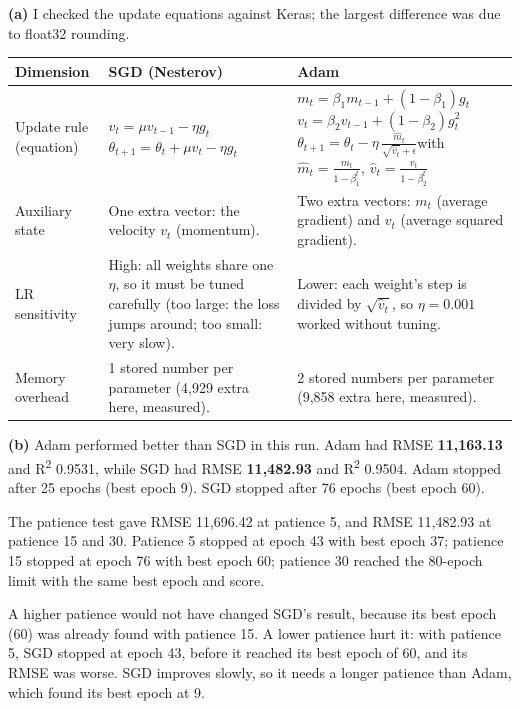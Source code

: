\documentclass[12pt,a4paper]{article}
\begin{document}
\begin{answerbox}
\textbf{(a)} I checked the update equations against Keras; the largest difference was due to float32 rounding.

\begin{center}
\renewcommand{\arraystretch}{1.5}
\begin{tabular}{|p{3.5cm}|p{4.5cm}|p{4.5cm}|}
\hline
\textbf{Dimension} & \textbf{SGD (Nesterov)} & \textbf{Adam} \\
\hline
Update rule (equation) & \small $v_t=\mu v_{t-1}-\eta g_t$\newline $\theta_{t+1}=\theta_t+\mu v_t-\eta g_t$ & \small $m_t=\beta_1 m_{t-1}+(1-\beta_1)g_t$\newline $v_t=\beta_2 v_{t-1}+(1-\beta_2)g_t^2$\newline $\theta_{t+1}=\theta_t-\eta\,\frac{\hat m_t}{\sqrt{\hat v_t}+\epsilon}$\newline with $\hat m_t=\frac{m_t}{1-\beta_1^t}$, $\hat v_t=\frac{v_t}{1-\beta_2^t}$ \\[4pt]
\hline
Auxiliary state & \small One extra vector: the velocity $v_t$ (momentum). & \small Two extra vectors: $m_t$ (average gradient) and $v_t$ (average squared gradient). \\[4pt]
\hline
LR sensitivity & \small High: all weights share one $\eta$, so it must be tuned carefully (too large: the loss jumps around; too small: very slow). & \small Lower: each weight's step is divided by $\sqrt{\hat v_t}$, so $\eta=0.001$ worked without tuning. \\[4pt]
\hline
Memory overhead & \small 1 stored number per parameter (4,929 extra here, measured). & \small 2 stored numbers per parameter (9,858 extra here, measured). \\[4pt]
\hline
\end{tabular}
\end{center}

\textbf{(b)} Adam performed better than SGD in this run. Adam had RMSE \textbf{11,163.13} and R\textsuperscript{2} 0.9531, while SGD had RMSE \textbf{11,482.93} and R\textsuperscript{2} 0.9504. Adam stopped after 25 epochs (best epoch 9). SGD stopped after 76 epochs (best epoch 60).

The patience test gave RMSE 11,696.42 at patience 5, and RMSE 11,482.93 at patience 15 and 30. Patience 5 stopped at epoch 43 with best epoch 37; patience 15 stopped at epoch 76 with best epoch 60; patience 30 reached the 80-epoch limit with the same best epoch and score.

A higher patience would not have changed SGD's result, because its best epoch (60) was already found with patience 15. A lower patience hurt it: with patience 5, SGD stopped at epoch 43, before it reached its best epoch of 60, and its RMSE was worse. SGD improves slowly, so it needs a longer patience than Adam, which found its best epoch at 9.
\end{answerbox}
\end{document}
